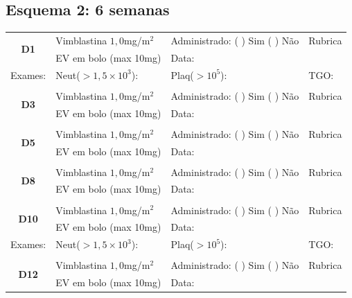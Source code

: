 \documentclass[11pt,a4paper,oldfontcommands]{memoir}
\begin{document}
\subsection{Esquema 2: 6 semanas}
\begin{center}
\begin{longtable}{p{1cm}p{5cm}|p{5cm}|p{3cm}}
    \hline
    \multicolumn{1}{c|}{\multirow{2}{*}{\textbf{D1}}}&{Vimblastina \(1,0\)mg/m\(^2\)}&{Administrado: (  ) Sim (  ) Não}&{Rubrica}\\
    \multicolumn{1}{c|}{}&{EV em bolo (max 10mg)}&{Data:}&\\
    \hline
    {\tiny{Exames:}}&{\tiny{Neut(\(>1,5\times10^3\)):}}&{\tiny{Plaq(\(>10^5\)):}}&{\tiny{TGO:}}
    \\
    \hline
    \\
    \hline
    \multicolumn{1}{c|}{\multirow{2}{*}{\textbf{D3}}}&{Vimblastina \(1,0\)mg/m\(^2\)}&{Administrado: (  ) Sim (  ) Não}&{Rubrica}\\
    \multicolumn{1}{c|}{}&{EV em bolo (max 10mg)}&{Data:}&\\
    \hline
    \\
    \hline
    \multicolumn{1}{c|}{\multirow{2}{*}{\textbf{D5}}}&{Vimblastina \(1,0\)mg/m\(^2\)}&{Administrado: (  ) Sim (  ) Não}&{Rubrica}\\
    \multicolumn{1}{c|}{}&{EV em bolo (max 10mg)}&{Data:}&\\
    \hline
    \\
    \hline
    \multicolumn{1}{c|}{\multirow{2}{*}{\textbf{D8}}}&{Vimblastina \(1,0\)mg/m\(^2\)}&{Administrado: (  ) Sim (  ) Não}&{Rubrica}\\
    \multicolumn{1}{c|}{}&{EV em bolo (max 10mg)}&{Data:}&\\
    \hline
    \\
    \hline
    \multicolumn{1}{c|}{\multirow{2}{*}{\textbf{D10}}}&{Vimblastina \(1,0\)mg/m\(^2\)}&{Administrado: (  ) Sim (  ) Não}&{Rubrica}\\
    \multicolumn{1}{c|}{}&{EV em bolo (max 10mg)}&{Data:}&\\
    \hline
    {\tiny{Exames:}}&{\tiny{Neut(\(>1,5\times10^3\)):}}&{\tiny{Plaq(\(>10^5\)):}}&{\tiny{TGO:}}
    \\
    \hline\\
    \hline
    \multicolumn{1}{c|}{\multirow{2}{*}{\textbf{D12}}}&{Vimblastina \(1,0\)mg/m\(^2\)}&{Administrado: (  ) Sim (  ) Não}&{Rubrica}\\
    \multicolumn{1}{c|}{}&{EV em bolo (max 10mg)}&{Data:}&\\

\end{longtable}
\end{center}
\end{document}
